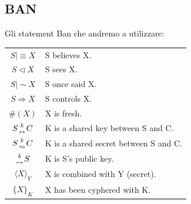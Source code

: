 \documentclass[a4paper,titlepage]{article}
\begin{document}
\subsection{BAN}
Gli statement Ban che andremo a utilizzare:
\begin{center}
\begin{tabular}{|c | l|} \hline
$ S \mid \equiv X  $ & S believes X.\\
$ S \lhd X  $ & S sees X.\\
$ S \mid \sim X  $ & S once said X.\\
$ S \Rightarrow X $ & S controls X.\\ 
$ \#(X) $ & X is fresh.\\
$S {k \atop \leftrightarrow} C $ & K is a shared key between S and C.\\ 
$S {k \atop \leftrightharpoons} C $ & K is a shared secret between S and C.\\ 
${k  \atop \mapsto} S $ & K is S's public key.\\
$\langle X \rangle_{Y}$ & X is combined with Y (secret).\\
$\{X\}_{K}$ & X has been cyphered with K.\\ \hline
\end{tabular}
\end{center}
\end{document}
